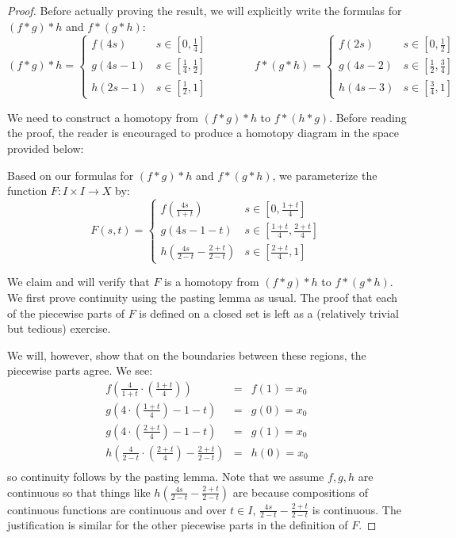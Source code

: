 \begin{proof}
Before actually proving the result, we will explicitly write the formulas for $(f*g)*h$ and $f*(g*h)$:
\[(f*g)*h = \begin{cases}f(4s) & s\in [0,\frac14] \\ g(4s-1) & s\in[\frac14,\frac12] \\ h(2s-1) & s\in [\frac12,1] \end{cases} \qquad\qquad
f*(g*h) = \begin{cases}f(2s) & s\in [0,\frac12] \\ g(4s-2) & s\in[\frac12,\frac34] \\ h(4s-3) & s\in [\frac34,1] \end{cases}\]

We need to construct a homotopy from $(f*g)*h$ to $f*(h*g)$.
Before reading the proof, the reader is encouraged to produce a homotopy diagram in the space provided below:
\placeholder

Based on our formulas for $(f*g)*h$ and $f*(g*h)$, we parameterize the function $F:I\times I \to X$ by:
\[F(s,t) = \begin{cases} f\left(\frac{4s}{1+t}  \right)& s \in \left[ 0,\frac{1+t}4 \right] \\
g(4s-1-t) & s\in \left[\frac{1+t}4, \frac{2+t}4\right]  \\ 
h\left(\frac{4s}{2-t} - \frac{2+t}{2-t} \right) & s\in \left[\frac{2+t}4,1\right]\end{cases}\]

We claim and will verify that $F$ is a homotopy from $(f*g)*h$ to $f*(g*h)$. We first prove continuity using the pasting lemma as usual. 
The proof that each of the piecewise parts of $F$ is defined on a closed set is left as a (relatively trivial but tedious) exercise.

We will, however, show that on the boundaries between these regions, the piecewise parts agree. We see:
\begin{eqnarray*}
f\left(\frac{4}{1+t} \cdot \left(\frac{1+t}4\right)\right) & = &  f(1)  =  x_0 \\
g\left(4\cdot\left(\frac{1+t}4\right)-1-t\right) & = & g(0)  =  x_0\\
g\left(4\cdot\left(\frac{2+t}4\right)-1-t\right) & = & g(1)  =  x_0\\
h\left(\frac{4}{2-t} \cdot \left(\frac{2+t}4\right)- \frac{2+t}{2-t}\right) & = & h(0)  =  x_0\\
\end{eqnarray*}
so continuity follows by the pasting lemma. Note that we assume $f,g,h$ are continuous so that things like $h\left(\frac{4s}{2-t} - \frac{2+t}{2-t} \right)$ are because compositions of continuous functions are continuous and over $t\in I$, $\frac{4s}{2-t} - \frac{2+t}{2-t}$ is continuous. The justification is similar for the other piecewise parts in the definition of $F$. 


\end{proof}
